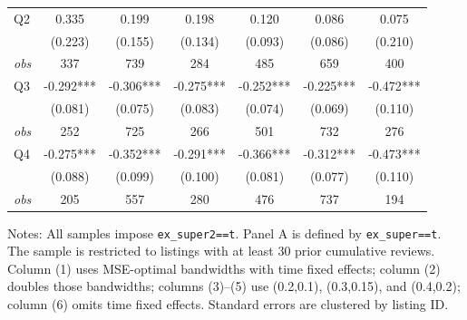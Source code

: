 \begin{table}[!htbp]
\begin{tabular}{lcccccc}
Q2 & 0.335 & 0.199 & 0.198 & 0.120 & 0.086 & 0.075 \\
 & (0.223) & (0.155) & (0.134) & (0.093) & (0.086) & (0.210) \\
\textit{obs} & 337 & 739 & 284 & 485 & 659 & 400 \\
Q3 & -0.292*** & -0.306*** & -0.275*** & -0.252*** & -0.225*** & -0.472*** \\
 & (0.081) & (0.075) & (0.083) & (0.074) & (0.069) & (0.110) \\
\textit{obs} & 252 & 725 & 266 & 501 & 732 & 276 \\
Q4 & -0.275*** & -0.352*** & -0.291*** & -0.366*** & -0.312*** & -0.473*** \\
 & (0.088) & (0.099) & (0.100) & (0.081) & (0.077) & (0.110) \\
\textit{obs} & 205 & 557 & 280 & 476 & 737 & 194 \\
\bottomrule
\end{tabular}
\begin{minipage}{0.98\textwidth}\footnotesize
Notes: All samples impose \texttt{ex\_super2==t}. Panel A is defined by \texttt{ex\_super==t}. The sample is restricted to listings with at least 30 prior cumulative reviews. Column (1) uses MSE-optimal bandwidths with time fixed effects; column (2) doubles those bandwidths; columns (3)--(5) use (0.2,0.1), (0.3,0.15), and (0.4,0.2); column (6) omits time fixed effects. Standard errors are clustered by listing ID.
\end{minipage}
\end{table}

